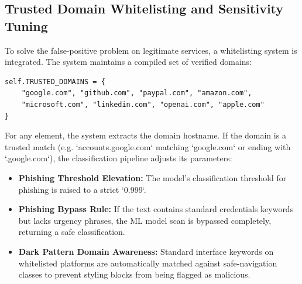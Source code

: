 \subsection{Trusted Domain Whitelisting and Sensitivity Tuning}
To solve the false-positive problem on legitimate services, a whitelisting system is integrated. The system maintains a compiled set of verified domains:
\begin{verbatim}
self.TRUSTED_DOMAINS = {
    "google.com", "github.com", "paypal.com", "amazon.com",
    "microsoft.com", "linkedin.com", "openai.com", "apple.com"
}
\end{verbatim}
For any element, the system extracts the domain hostname. If the domain is a trusted match (e.g. `accounts.google.com` matching `google.com` or ending with `.google.com`), the classification pipeline adjusts its parameters:
\begin{itemize}
    \item \textbf{Phishing Threshold Elevation:} The model's classification threshold for phishing is raised to a strict `0.999`.
    \item \textbf{Phishing Bypass Rule:} If the text contains standard credentials keywords but lacks urgency phrases, the ML model scan is bypassed completely, returning a safe classification.
    \item \textbf{Dark Pattern Domain Awareness:} Standard interface keywords on whitelisted platforms are automatically matched against safe-navigation classes to prevent styling blocks from being flagged as malicious.
\end{itemize}

